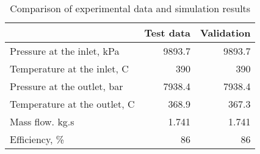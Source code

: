 \begin{table}
\label{tab:Approximate}
\caption{Comparison of experimental data and simulation results}
\begin{center}
\begin{tabulary}{0.9\textwidth}{LRR}
\toprule
& Test data \cite{Iverson_2013}  & Validation \\
\midrule
Pressure at the inlet, kPa & 9893.7 & 9893.7 \\
Temperature at the inlet, C & 390 & 390 \\
Pressure at the outlet, bar & 7938.4 & 7938.4 \\
Temperature at the outlet, C & 368.9 & 367.3 \\
Mass flow. kg.s & 1.741 & 1.741 \\
Efficiency, \% & 86 & 86 \\
\bottomrule
\end{tabulary}
\end{center}
\end{table}